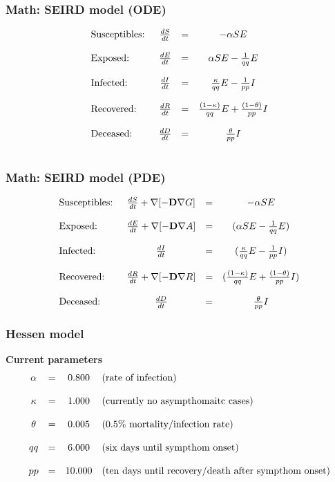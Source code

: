 \documentclass{beamer}
\begin{document}
\begin{frame}
	\frametitle{Math: SEIRD model (ODE)}
	\[
	\begin{array}{ l c c c }
		\text{Susceptibles: }& \frac{dS}{dt} & = & -\alpha SE  \\ \\
		\text{Exposed: }& \frac{dE}{dt} & = & \alpha SE-\frac{1}{qq}E\\ \\
		\text{Infected: }& \frac{dI}{dt} & = & \frac{\kappa}{qq} E-\frac{1}{pp}I\\ \\
		\text{Recovered: }& \frac{dR}{dt} & = & \frac{(1-\kappa)}{qq} E+\frac{(1-\theta)}{pp}I\\ \\
		\text{Deceased: }& \frac{dD}{dt} & = & \frac{\theta}{pp} I \\ \\
	\end{array}	
	\]
\end{frame}

\begin{frame}
	\frametitle{Math: SEIRD model (PDE)} 
	\[
	\begin{array}{ l c c c }
		\text{Susceptibles: }& \frac{d S}{dt} + \nabla[- \text{\textbf{D}} \nabla G] & = & - \alpha SE \\ \\
		\text{Exposed: }& \frac{d E}{dt} + \nabla[- \text{\textbf{D}} \nabla A] & = & (\alpha SE-\frac{1}{qq}E)\\ \\
		\text{Infected: }& \frac{d I}{dt} & = & (\frac{\kappa}{qq} E-\frac{1}{pp}I)\\ \\
		\text{Recovered: }& \frac{d R}{dt} + \nabla[- \text{\textbf{D}} \nabla R]
			& = & (\frac{(1-\kappa)}{qq} E+\frac{(1-\theta)}{pp}I)\\ \\
		\text{Deceased: }& \frac{d D}{dt} & = & \frac{\theta}{pp} I
	\end{array}	
	\]
\end{frame}

\begin{frame}
	\frametitle{Hessen model} 
	\textbf{Current parameters}
	\[
	\begin{array}{ c c c l }
		\alpha & = & 0.800 & \text{(rate of infection)}\\ \\
		\kappa & = & 1.000 & \text{(currently no asympthomaitc cases)}\\ \\
		\theta & = & 0.005 & \text{(0.5\% mortality/infection rate)}\\ \\
		qq & = & 6.000 & \text{(six days until sympthom onset)}\\ \\
		pp & = & 10.000 & \text{(ten days until recovery/death after sympthom onset)}
	\end{array}	
	\]
\end{frame}
\end{document}

